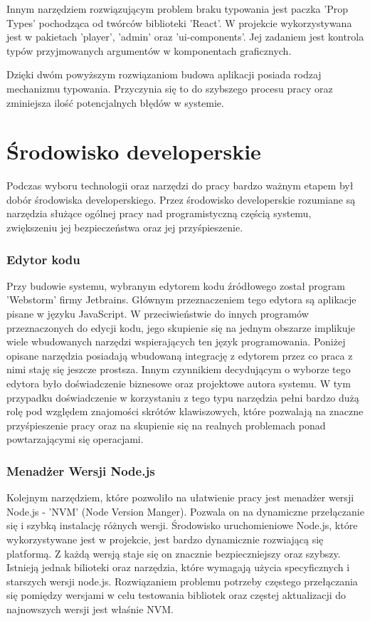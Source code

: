 Innym narzędziem rozwiązującym problem braku typowania jest paczka 'Prop Types' pochodząca od twórców biblioteki 'React'. W projekcie wykorzystywana jest w pakietach 'player', 'admin' oraz 'ui-components'. Jej zadaniem jest kontrola typów przyjmowanych argumentów w komponentach graficznych.

Dzięki dwóm powyższym rozwiązaniom budowa aplikacji posiada rodzaj mechanizmu typowania. Przyczynia się to do szybszego procesu pracy oraz zminiejsza ilość potencjalnych błędów w systemie.

\section{Środowisko developerskie}
Podczas wyboru technologii oraz narzędzi do pracy bardzo ważnym etapem był dobór środowiska developerskiego. Przez środowisko developerskie rozumiane są narzędzia służące ogólnej pracy nad programistyczną częścią systemu, zwiększeniu jej bezpieczeństwa oraz jej przyśpieszenie.

\subsubsection{Edytor kodu}
Przy budowie systemu, wybranym edytorem kodu źródłowego został program 'Webstorm' firmy Jetbrains. Głównym przeznaczeniem tego edytora są aplikacje pisane w języku JavaScript. W przeciwieństwie do innych programów przeznaczonych do edycji kodu, jego skupienie się na jednym obszarze implikuje wiele wbudowanych narzędzi wspierających ten język programowania. Poniżej opisane narzędzia posiadają wbudowaną integrację z edytorem przez co praca z nimi staję się jeszcze prostsza. Innym czynnikiem decydującym o wyborze tego edytora było doświadczenie biznesowe oraz projektowe autora systemu. W tym przypadku doświadczenie w korzystaniu z tego typu narzędzia pełni bardzo dużą rolę pod względem znajomości skrótów klawiszowych, które pozwalają na znaczne przyśpieszenie pracy oraz na skupienie się na realnych problemach ponad powtarzającymi się operacjami.


\subsubsection{Menadżer Wersji Node.js}
Kolejnym narzędziem, które pozwoliło na ułatwienie pracy jest menadżer wersji Node.js - 'NVM' (Node Version Manger).
Pozwala on na dynamiczne przełączanie się i szybką instalację różnych wersji. Środowisko uruchomieniowe Node.js, które wykorzystywane jest w projekcie, jest bardzo dynamicznie rozwiającą się platformą. Z każdą wersją staje się on znacznie bezpieczniejszy oraz szybszy. Istnieją jednak bilioteki oraz narzędzia, które wymagają użycia specyficznych \newline i starszych wersji node.js. Rozwiązaniem problemu potrzeby częstego przełączania się pomiędzy wersjami w celu testowania bibliotek oraz częstej aktualizacji do najnowszych wersji jest właśnie NVM. \cite{NVMDocs}

